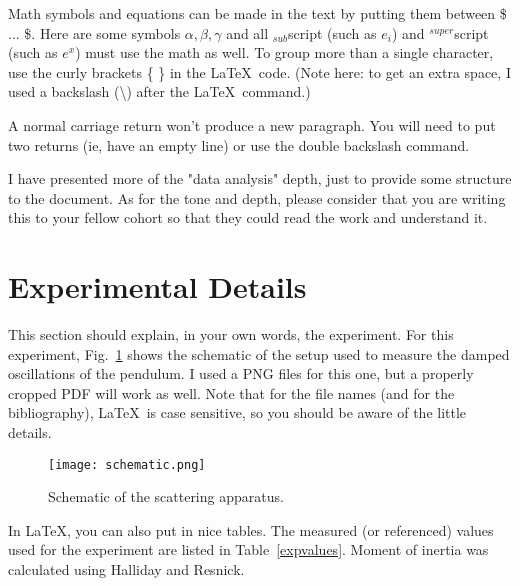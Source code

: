 \documentclass[prb,preprint,groupaddress,showpacs,superbib,floats]{revtex4-1}
\begin{document}
Math symbols and equations can be made in the text by putting them between \$ ... \$.  Here are some symbols $ \alpha, \beta, \gamma $ and all $_{sub}$script (such as $e_i$) and $^{super}$script (such as $e^x$) must use the math as well.  To group more than a single character, use the curly brackets \{ \} in the \LaTeX \ code. (Note here: to get an extra space, I used a backslash (\textbackslash) after the \LaTeX \ command.)

A normal carriage return won't produce a new paragraph.  You will need to put two returns (ie, have an empty line) or use the double backslash command.

I have presented more of the "data analysis" depth, just to provide some structure to the document.  As for the tone and depth, please consider that you are writing this to your fellow cohort so that they could read the work and understand it.


\section{Experimental Details}\label{experiment}

This section should explain, in your own words, the experiment.  For this experiment, Fig.~\ref{schematic} shows the schematic of the setup used to measure the damped oscillations of the pendulum.  I used a PNG files for this one, but a properly cropped PDF will work as well.  Note that for the file names (and for the bibliography), \LaTeX \ is case sensitive, so you should be aware of the little details.


%
\begin{figure}[h]
\centering
\texttt{[image: schematic.png]}
\caption{Schematic of the scattering apparatus.}
\label{schematic}
\end{figure}

In \LaTeX, you can also put in nice tables.  The measured (or referenced) values used for the experiment are listed in Table~\ref{expvalues}.  Moment of inertia was calculated using Halliday and Resnick.\cite{Halliday13}

%
\end{document}
